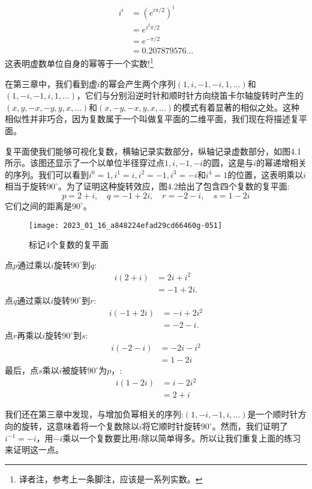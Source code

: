 $$
\begin{aligned}
i^{i} & =\left(e^{i \pi / 2}\right)^{i} \\
& =e^{i^{2} \pi / 2} \\
& =e^{-\pi / 2} \\
& =0.207879576 \ldots
\end{aligned}
$$
这表明虚数单位自身的幂等于一个实数!\footnote{译者注，参考上一条脚注，应该是一系列实数。}

在第三章中，我们看到虚$i$的幂会产生两个序列$(1,i,-1,-i, 1, \ldots)$和$(1,-i,-1, i, 1, \ldots)$，它们与分别沿逆时针和顺时针方向绕笛卡尔轴旋转时产生的$(x, y,-x,-y, y, x, \ldots)$和$(x,-y,-x, y, x, \ldots)$的模式有着显著的相似之处。这种相似性并非巧合，因为复数属于一个叫做复平面的二维平面，我们现在将描述复平面。

复平面使我们能够可视化复数，横轴记录实数部分，纵轴记录虚数部分，如图4.1所示。该图还显示了一个以单位半径穿过点$1,i,-1,-i$的圆，这是与$i$的幂递增相关的序列。我们可以看到$i^{0}=1, i^{1}=i, i^{2}=-1, i^{3}=-i$和$i^{4}=1$的位置，这表明乘以$i$相当于旋转$90^{\circ}$。为了证明这种旋转效应，图4.2给出了包含四个复数的复平面:
$$
p=2+i, \quad q=-1+2 i, \quad r=-2-i, \quad s=1-2 i
$$
它们之间的距离是$90^{\circ}$。

\begin{figure}[h!]
    \centering
    \texttt{[image: 2023\_01\_16\_a848224efad29cd66460g-051]}
    \caption{标记4个复数的复平面}
\end{figure}

点$p$通过乘以$i$旋转$90^{\circ}$到$q$:
$$
\begin{aligned}
i(2+i) & =2 i+i^{2} \\
& =-1+2 i .
\end{aligned}
$$
点$q$通过乘以$i$旋转$90^{\circ}$到$r$:
$$
\begin{aligned}
i(-1+2 i) & =-i+2 i^{2} \\
& =-2-i .
\end{aligned}
$$
点$r$再乘以$i$旋转$90^{\circ}$到$s$:
$$
\begin{aligned}
i(-2-i) & =-2 i-i^{2} \\
& =1-2 i
\end{aligned}
$$
最后，点$s$乘以$i$被旋转$90^{\circ}$为$p$，:
$$
\begin{aligned}
i(1-2 i) & =i-2 i^{2} \\
& =2+i
\end{aligned}
$$

我们还在第三章中发现，与增加负幂相关的序列:$(1,-i,-1, i, \ldots)$是一个顺时针方向的旋转，这意味着将一个复数除以$i$将它顺时针旋转$90^{\circ}$。然而，我们证明了$i^{-1}=-i$，用$-i$乘以一个复数要比用$i$除以简单得多。所以让我们重复上面的练习来证明这一点。

